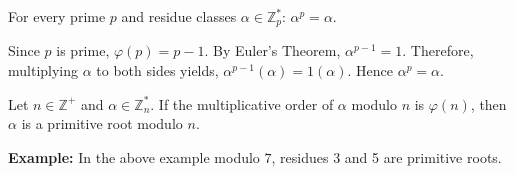     \newpage

    \begin{theo}
        
        For every prime $p$ and residue classes $\alpha\in\mathbb{Z}_p^*$: $\alpha^{p}= \alpha$.
    \end{theo}

    \begin{Proof}
        Since $p$ is prime, $\varphi(p)=p-1$. By Euler's Theorem, $\alpha^{p-1}=1$. 
        Therefore, multiplying $\alpha$ to both sides yields, $\alpha^{p-1}(\alpha)= 1(\alpha)$. Hence $\alpha^p = \alpha$.
    \end{Proof}

    \begin{Def}
        
        Let $n\in\mathbb{Z^+}$ and $\alpha\in\mathbb{Z}_n^*$. If the multiplicative order of $\alpha$ modulo $n$ is $\varphi(n)$, then $\alpha$ is a primitive root modulo $n$.
    \end{Def}
    \textbf{Example:} In the above example modulo $7$, residues 3 and 5 are primitive roots.\\

